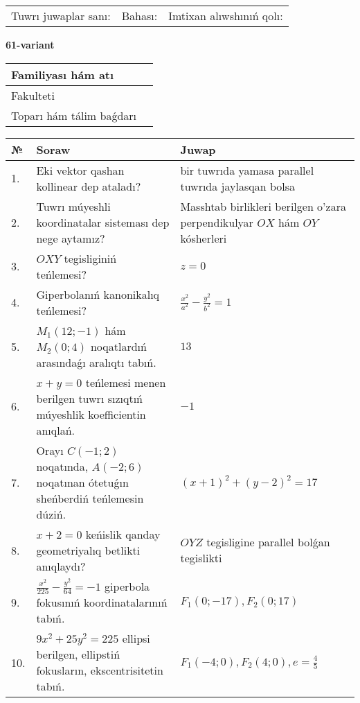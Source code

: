 \documentclass{article}
\begin{document}
\vspace{1cm}

\begin{tabular}{lll}
Tuwrı juwaplar sanı: \underline{\hspace{1.5cm}} & 
Bahası: \underline{\hspace{1.5cm}} & 
Imtixan alıwshınıń qolı: \underline{\hspace{2cm}} \\
\end{tabular}

\egroup

\newpage


\textbf{61-variant}\\

\bgroup
\def\arraystretch{1.6} %

\begin{tabular}{|m{5.7cm}|m{9.5cm}|}
\hline
Familiyası hám atı & \\
\hline
Fakulteti  & \\
\hline
Toparı hám tálim baǵdarı  & \\
\hline
\end{tabular}

\vspace{1cm}

\begin{tabular}{|m{0.7cm}|m{10cm}|m{4cm}|}
\hline
№ & Soraw & Juwap \\
\hline
1. & Eki vektor qashan kollinear dep ataladı? & bir tuwrıda yamasa parallel tuwrıda jaylasqan bolsa \\
\hline
2. & Tuwrı múyeshli koordinatalar sisteması dep nege aytamız? & Masshtab birlikleri berilgen o'zara perpendikulyar $OX$ hám $OY$ kósherleri \\
\hline
3. & $OXY$ tegisliginiń teńlemesi? & $z=0$ \\
\hline
4. & Giperbolanıń kanonikalıq teńlemesi? & $\frac{x^2}{a^2}-\frac{y^2}{b^2}=1$ \\
\hline
5. & $M_{1} (12;-1)$ hám $M_{2} (0;4)$ noqatlardıń arasındaǵı aralıqtı tabıń. & $13$ \\
\hline
6. & $x+y=0$ teńlemesi menen berilgen tuwrı sızıqtıń múyeshlik koefficientin anıqlań. & $- 1$ \\
\hline
7. & Orayı $C (-1;2)$ noqatında, $A (-2;6 )$ noqatınan ótetuǵın sheńberdiń teńlemesin dúziń. & $(x+1)^{2}+(y-2)^{2}=17$ \\
\hline
8. & $x+2=0$ keńislik qanday geometriyalıq betlikti anıqlaydı? &  $OYZ$ tegisligine parallel bolǵan tegislikti \\
\hline
9. & $\frac{x^{2}}{225}-\frac{y^{2}}{64}=-1$ giperbola fokusınıń koordinatalarınıń tabıń. & $F_{1}(0;-17), F_{2}(0;17)$ \\
\hline
10. & $9x^{2}+25y^{2}=225$ ellipsi berilgen, ellipstiń fokusların, ekscentrisitetin tabıń. & $F_1\left(-4;0 \right) , F_2\left( 4;0 \right) , e = \frac{4}{5}$ \\
\hline
\end{tabular}
\end{document}
